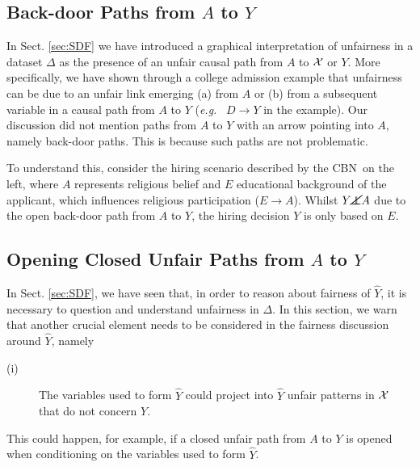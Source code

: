 \documentclass[runningheads]{llncs}
\newcommand{\secref}[1]{Sect. \ref{#1}}
\newcommand\independent{\protect\mathpalette{\protect\independenT}{\perp}}
\def\independenT#1#2{\mathrel{\rlap{$#1#2$}\mkern2mu{#1#2}}}
\newcommand{\eg}{\emph{e.g.}}
\newcommand{\CBN}{CBN}
\begin{document}
\subsection{Back-door Paths from $A$ to $Y$}
In \secref{sec:SDF} we have introduced a graphical interpretation of unfairness in a dataset $\Delta$ as the presence of an unfair causal path from $A$ to ${\cal X}$ or $Y$. More specifically, we have shown through a college admission example that unfairness can be due to an unfair link emerging (a) from $A$ or (b) from a subsequent variable in a causal path from $A$ to $Y$ (\eg~ $D\rightarrow Y$ in the example). Our discussion did not mention paths from $A$ to $Y$ with an arrow pointing into $A$, namely back-door paths. This is because such paths are not problematic.

\begin{figure}
\vskip-0.7cm
\centering
{}
\end{figure}
\noindent To understand this, consider the hiring scenario described by the \CBN~on the left, where $A$ represents religious belief and $E$ educational background of the applicant, which influences religious participation ($E\rightarrow A$). 
Whilst $Y \cancel{\independent} A$ due to the open back-door path from $A$ to $Y$, the hiring decision $Y$ is only based on $E$.

\subsection{Opening Closed Unfair Paths from $A$ to $Y$}
In \secref{sec:SDF}, we have seen that, in order to reason about fairness of $\hat Y$, it is necessary to question and understand unfairness in $\Delta$. In this section, we warn that another crucial element needs to be considered in the fairness discussion around $\hat Y$, namely  
\begin{description}
\item[(i)] The variables used to form $\hat Y$ could project into $\hat Y$ unfair patterns in ${\cal X}$ that do not concern $Y$. 
\end{description}
This could happen, for example, if a closed unfair path from $A$ to $Y$ is opened when conditioning on the variables used to form $\hat Y$. 
\end{document}
